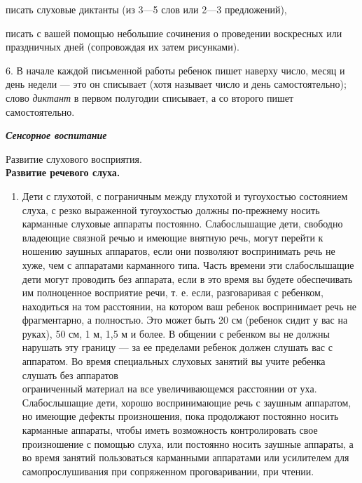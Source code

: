 \documentclass{book}
\renewcommand{\emph}[1]{\textit{#1}}
\begin{document}
писать слуховые диктанты (из 3---5 слов или 2---3 предложений),

писать с вашей помощью небольшие сочинения о проведении воскресных или
праздничных дней (сопровождая их затем рисунками).

6. В начале каждой письменной работы ребенок пишет наверху число, месяц
и день недели --- это он списывает (хотя называет число и день
самостоятельно); слово \emph{диктант} в первом полугодии списывает, а со
второго пишет самостоятельно.

\emph{\textbf{Сенсорное воспитание}}

Развитие слухового восприятия.\\
\textbf{Развитие речевого слуха.}


\begin{enumerate}
\def\labelenumi{\arabic{enumi}.}
\item
  
  Дети с глухотой, с пограничным между глухотой и тугоухостью состоянием
  слуха, с резко выраженной тугоухостью должны по-прежнему носить
  карманные слуховые аппараты постоянно. Слабослышащие дети, свободно
  владеющие связной речью и имеющие внятную речь, могут перейти к
  ношению заушных аппаратов, если они позволяют воспринимать речь не
  хуже, чем с аппаратами карманного типа. Часть времени эти
  слабослышащие дети могут проводить без аппарата, если в это время вы
  будете обеспечивать им полноценное восприятие речи, т. е. если,
  разговаривая с ребенком, находиться на том расстоянии, на котором ваш
  ребенок воспринимает речь не фрагментарно, а полностью. Это может быть
  20 см (ребенок сидит у вас на руках), 50 см, 1 м, 1,5 м и более. В
  общении с ребенком вы не должны нарушать эту границу --- за ее
  пределами ребенок должен слушать вас с аппаратом. Во время специальных
  слуховых занятий вы учите ребенка слушать без аппаратов\\
  ограниченный материал на все увеличивающемся расстоянии от уха.
  Слабослышащие дети, хорошо воспринимающие речь с заушным аппаратом, но
  имеющие дефекты произношения, пока продолжают постоянно носить
  карманные аппараты, чтобы иметь возможность контролировать свое
  произношение с помощью слуха, или постоянно носить заушные аппараты, а
  во время занятий пользоваться карманными аппаратами или усилителем для
  самопрослушивания при сопряженном проговаривании, при чтении.
  
\end{enumerate}
\end{document}
